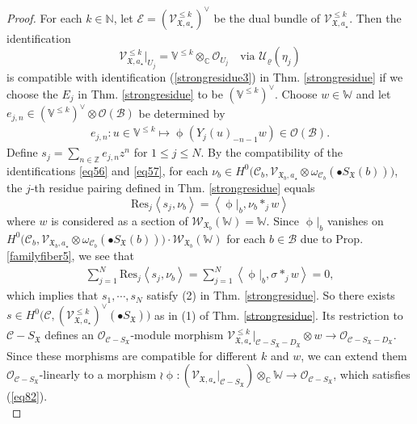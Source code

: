 \documentclass[11pt,b5paper,notitlepage]{article}
\theoremstyle{definition}
\theoremstyle{plain}
\newcommand{\fk}{\mathfrak}
\newcommand{\mc}{\mathcal}
\newcommand{\Res}{\mathrm{Res}}
\newcommand{\SV}{\mathscr{V}}
\newcommand{\scr}{\mathscr}
\newcommand{\SX}{{S_{\fk X}}}
\newcommand{\DX}{D_{\fk X}}
\newcommand{\blt}{\bullet}
\newcommand{\Vbb}{\mathbb V}
\newcommand{\Wbb}{\mathbb W}
\newcommand{\Cbb}{\mathbb C}
\newcommand{\Nbb}{\mathbb N}
\newcommand{\Zbb}{\mathbb Z}
\newcommand{\<}{\left\langle}
\renewcommand{\>}{\right\rangle}
\newcommand{\MO}{\mathcal{O}}
\newcommand{\MU}{\mathcal{U}}
\newcommand{\MC}{\mathcal{C}}
\newcommand{\MB}{\mathcal{B}}
\newcommand{\fx}{\mathfrak{X}}
\newcommand{\SW}{\mathscr{W}}
\numberwithin{equation}{subsection}
\begin{document}
\begin{proof}
For each $k\in \Nbb$, let $\scr E=(\SV_{\fx,a_\star}^{\leq k})^\vee$        be the dual bundle of $\SV_{\fx,a_\star}^{\leq k}$. Then the identification
        \begin{equation}\label{eq57}
        \SV_{\fx,a_\star}^{\leq k}\vert_{U_j}=\Vbb^{\leq k}\otimes_\Cbb \MO_{U_j} \quad \text{via }\MU_\varrho(\eta_j)
        \end{equation}
        is compatible with identification (\ref{strongresidue3}) in Thm. \ref{strongresidue} if we choose the $E_j$ in Thm. \ref{strongresidue}  to be $(\Vbb^{\leq k})^\vee$. Choose $w\in \Wbb$ and let $e_{j,n}\in (\Vbb^{\leq k})^\vee\otimes \MO(\MB)$ be determined by
\begin{align}
e_{j,n}:        u\in \Vbb^{\leq k}\mapsto \upphi(Y_j(u)_{-n-1}w)\in \MO(\MB).
\end{align}
        Define $s_j=\sum_{n\in \Zbb}e_{j,n}z^n$ for $1\leq j \leq N$. By the compatibility of the identifications \eqref{eq56} and \eqref{eq57}, for each $\nu_b\in H^0\big(\MC_b,\SV_{\fx_b,a_\star}\otimes \omega_{\MC_b}(\blt S_\fx(b))\big)$, the $j$-th residue pairing defined in Thm. \ref{strongresidue} equals
        $$
        \Res_j \<s_j,\nu_b\>=\<\upphi\vert_b,\nu_b *_j w\>
        $$
where $w$ is considered as a section of $\SW_{\fx_b}(\Wbb)=\Wbb$. Since $\upphi\vert_b$ vanishes on $H^0\big(\MC_b,\SV_{\fx_b,a_\star}\otimes \omega_{\MC_b}(\blt S_\fx(b))\big)\cdot \SW_{\fx_b}(\Wbb)$ for each $b\in \MB$ due to Prop. \ref{familyfiber5}, we see that
\begin{gather*}
\sum_{j=1}^N \Res_j \<s_j,\nu_b\>=\sum_{j=1}^N\<\upphi\vert_b,\sigma *_j w\>=0,
\end{gather*}
which implies that $s_1,\cdots,s_N$ satisfy (2) in Thm. \ref{strongresidue}. So there exists $s\in H^0\big(\MC,(\SV_{\fx,a_\star}^{\leq k})^\vee(\blt S_\fx)\big)$ as in (1) of Thm. \ref{strongresidue}. Its restriction to $\mc C-\SX$ defines an $\MO_{\MC-S_\fx}$-module morphism $\SV_{\fx,a_\star}^{\leq k}|_{\mc C-\SX-\DX}\otimes w\rightarrow \MO_{\MC-S_\fx-D_\fx}$. Since these morphisms are compatible for different $k$ and $w$, we can extend them $\MO_{\MC-S_\fx}$-linearly to a morphism $\wr\upphi:(\SV_{\fx,a_\star}|_{\mc C-\SX})\otimes_\Cbb \Wbb\rightarrow \MO_{\MC-S_\fx}$, which satisfies (\ref{eq82}).\\



\end{proof}
\end{document}
